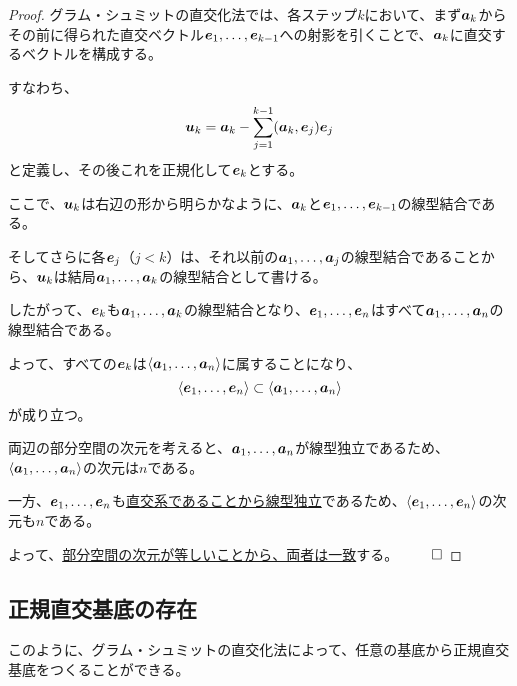 \documentclass[../../../topic_linear-algebra]{subfiles}
\begin{document}
\begin{proof}
  グラム・シュミットの直交化法では、各ステップ$k$において、まず$\vb*{a}_k$からその前に得られた直交ベクトル$\vb*{e}_1, \ldots, \vb*{e}_{k-1}$への射影を引くことで、$\vb*{a}_k$に直交するベクトルを構成する。

  すなわち、
  \begin{equation*}
    \vb*{u}_k = \vb*{a}_k - \sum_{j=1}^{k-1} (\vb*{a}_k, \vb*{e}_j) \vb*{e}_j
  \end{equation*}
  と定義し、その後これを正規化して$\vb*{e}_k$とする。

  \br

  ここで、$\vb*{u}_k$は右辺の形から明らかなように、$\vb*{a}_k$と$\vb*{e}_1, \ldots, \vb*{e}_{k-1}$の線型結合である。

  そしてさらに各$\vb*{e}_j$（$j < k$）は、それ以前の$\vb*{a}_1, \ldots, \vb*{a}_j$の線型結合であることから、$\vb*{u}_k$は結局$\vb*{a}_1, \ldots, \vb*{a}_k$の線型結合として書ける。

  したがって、$\vb*{e}_k$も$\vb*{a}_1, \ldots, \vb*{a}_k$の線型結合となり、$\vb*{e}_1, \ldots, \vb*{e}_n$はすべて$\vb*{a}_1, \ldots, \vb*{a}_n$の線型結合である。

  \br

  よって、すべての$\vb*{e}_k$は$\langle \vb*{a}_1, \ldots, \vb*{a}_n \rangle$に属することになり、
  \begin{equation*}
    \langle \vb*{e}_1, \ldots, \vb*{e}_n \rangle \subset \langle \vb*{a}_1, \ldots, \vb*{a}_n \rangle
  \end{equation*}
  が成り立つ。

  \br

  両辺の部分空間の次元を考えると、$\vb*{a}_1, \ldots, \vb*{a}_n$が線型独立であるため、$\langle \vb*{a}_1, \ldots, \vb*{a}_n \rangle$の次元は$n$である。

  一方、$\vb*{e}_1, \ldots, \vb*{e}_n$も\hyperref[thm:orthogonal-set-is-independent]{直交系であることから線型独立}であるため、$\langle \vb*{e}_1, \ldots, \vb*{e}_n \rangle$の次元も$n$である。

  よって、\hyperref[thm:equal-dim-implies-equal-subspace]{部分空間の次元が等しいことから、両者は一致}する。 $\qed$
\end{proof}

\subsection{正規直交基底の存在}

このように、グラム・シュミットの直交化法によって、任意の基底から正規直交基底をつくることができる。
\end{document}
